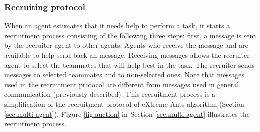 \subsubsection{Recruiting protocol}
\label{sec:recruiting}
When an agent estimates that it needs help to perform a task, it starts a recruitment process consisting of the following three steps: first, a  message is sent by the recruiter agent to other agents. Agents who receive the  message and are available to help  send back an  message. 
Receiving  messages allows the recruiter agent to select the teammates that will help best in the task. 
The recruiter sends  messages to selected teammates and  to non-selected ones.  Note that  messages used in the recruitment protocol are different from  messages used in general communication (previously described). This recruitment process is a simplification of the recruitment protocol of eXtreme-Ants algorithm (Section \ref{sec:multi-agent}). Figure \ref{fig:auction} in Section \ref{sec:multi-agent} illustrates the recruitment process.


